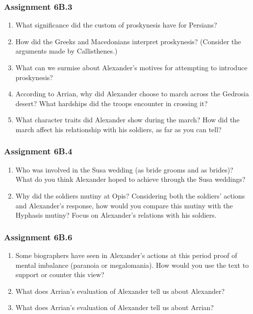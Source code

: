 \documentclass{article}
\begin{document}
\subsubsection*{Assignment 6B.3}
\begin{enumerate}
  \item What significance did the custom of proskynesis have for Persians?
  \item How did the Greeks and Macedonians interpret proskynesis? (Consider the arguments made by Callisthenes.)
  \item What can we surmise about Alexander’s motives for attempting to introduce proskynesis?
  \item According to Arrian, why did Alexander choose to march across the Gedrosia desert? What hardships did the troops encounter in crossing it?
  \item What character traits did Alexander show during the march? How did the march affect his relationship with his soldiers, as far as you can tell?
\end{enumerate}
\subsubsection*{Assignment 6B.4}
\begin{enumerate}
  \item Who was involved in the Susa wedding (as bride grooms and as brides)? What do you think Alexander hoped to achieve through the Susa weddings?
  \item Why did the soldiers mutiny at Opis? Considering both the soldiers’ actions and Alexander’s response, how would you compare this mutiny with the Hyphasis mutiny? Focus on Alexander’s relations with his soldiers.
\end{enumerate}
\subsubsection*{Assignment 6B.6}
\begin{enumerate}
  \item Some biographers have seen in Alexander’s actions at this period proof of mental imbalance (paranoia or megalomania). How would you use the text to support or counter this view?
  \item What does Arrian’s evaluation of Alexander tell us about Alexander?
  \item What does Arrian’s evaluation of Alexander tell us about Arrian?
\end{enumerate}
\end{document}
